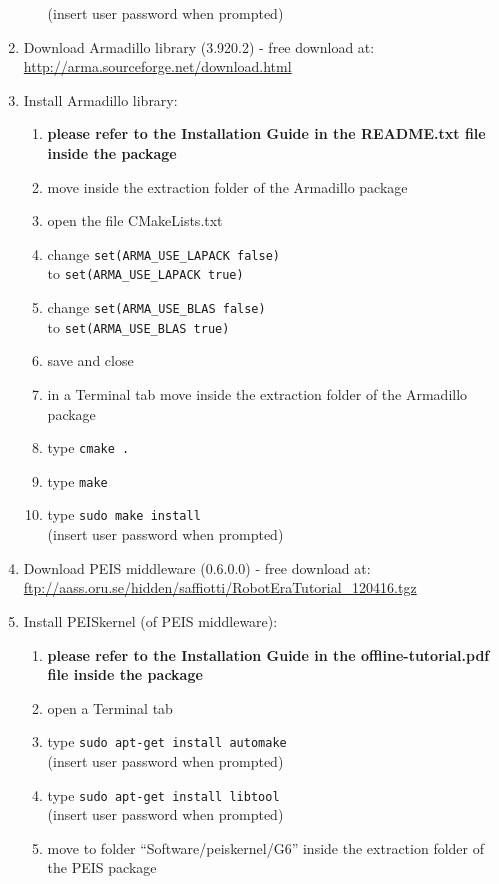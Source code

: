 \documentclass[10pt,a4paper]{report}
\begin{document}
\begin{enumerate}
\begin{enumerate}
(insert user password when prompted)
\end{enumerate}
\item Download Armadillo library (3.920.2) - free download at:\\
\url{http://arma.sourceforge.net/download.html}
\item Install Armadillo library:
\begin{enumerate}
\item \textbf{please refer to the Installation Guide in the README.txt file inside the package}
\item move inside the extraction folder of the Armadillo package
\item open the file CMakeLists.txt
\item change \verb+set(ARMA_USE_LAPACK false)+\\
to \verb+set(ARMA_USE_LAPACK true)+
\item change \verb+set(ARMA_USE_BLAS false)+\\
to \verb+set(ARMA_USE_BLAS true)+
\item save and close
\item in a Terminal tab move inside the extraction folder of the Armadillo package
\item type \verb+cmake .+
\item type \verb+make+
\item type \verb+sudo make install+\\
(insert user password when prompted)
\end{enumerate}
\item Download PEIS middleware (0.6.0.0) - free download at:\\
\url{ftp://aass.oru.se/hidden/saffiotti/RobotEraTutorial_120416.tgz}
\item Install PEISkernel (of PEIS middleware):
\begin{enumerate}
\item \textbf{please refer to the Installation Guide in the offline-tutorial.pdf file inside the package}
\item open a Terminal tab
\item type \verb+sudo apt-get install automake+\\
(insert user password when prompted)
\item type \verb+sudo apt-get install libtool+\\
(insert user password when prompted)
\item move to folder “Software/peiskernel/G6” inside the extraction folder of the PEIS package

\end{enumerate}
\end{enumerate}
\end{document}
